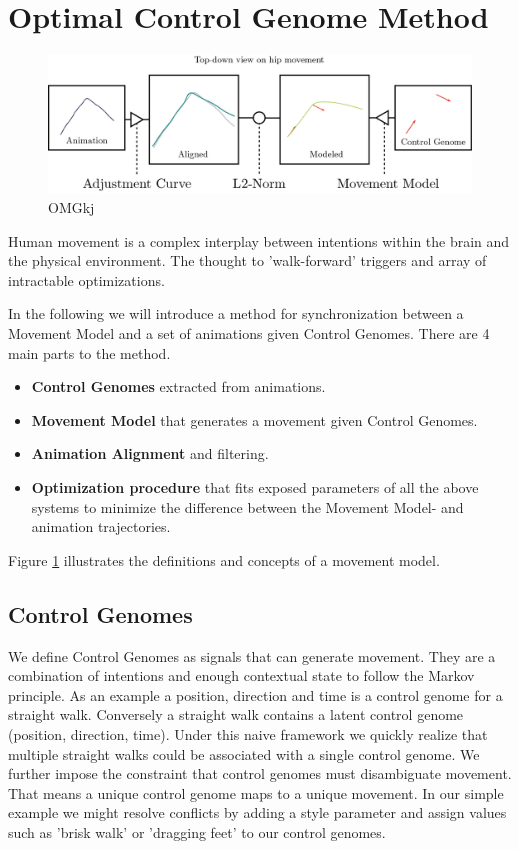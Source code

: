\section{Optimal Control Genome Method}
\begin{figure}
    \centering
    \includegraphics[width=0.75\linewidth]{img/overview}
    \caption{OMGkj}
    \label{fig:movement:overview}
\end{figure}
Human movement is a complex interplay between intentions within the brain and the physical environment. The thought to 'walk-forward' triggers and array of intractable optimizations.  

In the following we will introduce a method for synchronization between a Movement Model and a set of animations given Control Genomes. There are 4 main parts to the method. 
\begin{itemize}
    \item \textbf{Control Genomes} extracted from animations.
    \item \textbf{Movement Model} that generates a movement given Control Genomes.
    \item \textbf{Animation Alignment} and filtering. 
    \item \textbf{Optimization procedure} that fits exposed parameters of all the above systems to minimize the difference between the Movement Model- and animation trajectories.
\end{itemize}
Figure \ref{fig:movement:overview} illustrates the definitions and concepts of a movement model.

\subsection{Control Genomes}
We define Control Genomes as signals that can generate movement. They are a combination of intentions and enough contextual state to follow the Markov principle. As an example a position, direction and time is a control genome for a straight walk. Conversely a straight walk contains a latent control genome (position, direction, time). Under this naive framework we quickly realize that multiple straight walks could be associated with a single control genome. We further impose the constraint that control genomes must disambiguate movement. That means a unique control genome maps to a unique movement. In our simple example we might resolve conflicts by adding a style parameter and assign values such as 'brisk walk' or 'dragging feet' to our control genomes. 

